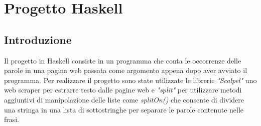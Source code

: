 \documentclass[a4paper, 11pt]{article}
\begin{document}
\section{Progetto Haskell}
\subsection{Introduzione}
Il progetto in Haskell consiste in un programma che conta le occorrenze delle parole in una pagina web passata come argomento appena dopo aver avviato il programma.
Per realizzare il progetto sono state utilizzate le librerie \textit{"Scalpel"} uno web scraper per estrarre testo dalle pagine web e \textit{"split"} per utilizzare metodi aggiuntivi di manipolazione delle liste come \textit{splitOn()} che consente di dividere una stringa in una lista di sottostringhe per separare le parole contenute nelle frasi.
\end{document}
